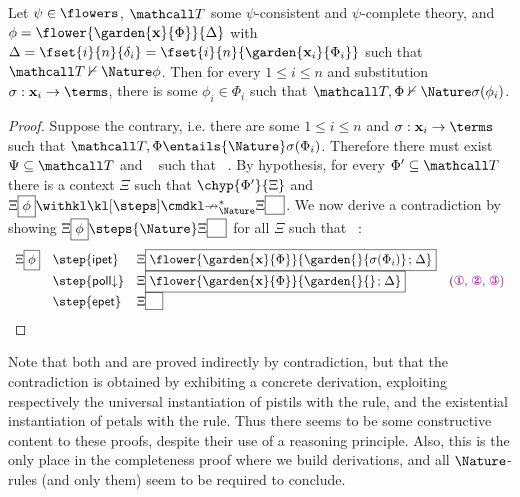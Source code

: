 \begin{proposition}
  
  Let $\psi \in \flowers$, $\tT$ some $\psi$-consistent and $\psi$-complete
  theory, and $\phi = \flower{\garden{\bx}{\Phi}}{\Delta}$ with $\Delta
  = \fset{i}{n}{\delta_i} = \fset{i}{n}{\garden{\bx_i}{\Phi_i}}$ such
  that $\tT \nvdash{\Nature} \phi$. Then for every $1 \leq i \leq n$ and substitution
  $\sigma : \bx_i \to \terms$, there is some $\phi_i \in \Phi_i$ such
  that $\tT, \Phi \nvdash{\Nature} \sigma(\phi_i)$.
\end{proposition}
\begin{proof}
  Suppose the contrary, i.e. there are some $1 \leq i \leq n$ and $\sigma :
  \bx_i \to \terms$ such that $\tT, \Phi \entails{\Nature} \sigma(\Phi_i)$.
  Therefore there must exist $\Psi \subseteq \tT$ and \Hyp{$\Phi_0 \subseteq
  \Phi$}~{\HOne} such that ~{\HTwo}. By hypothesis, for every $\Phi' \subseteq \tT$ there
  is a context $\Xi$ such that $\chyp{\Phi'}{\Xi}$ and $\cfill{\Xi}{\phi}
  \notsteps{\Nature} \cfill{\Xi}{\phantom{\Phi}}$. We now derive a contradiction
  by showing $\cfill{\Xi}{\phi} \steps{\Nature} \cfill{\Xi}{\phantom{\Phi}}$ for
  all $\Xi$ such that \Hyp{$\chyp{\Psi}{\Xi}$}~{\HThree}:
  $$
  \begin{array}{rlll}
    \cfill{\Xi}{\phi}
    &\step{\mathsf{ipet}} &\cfill{\Xi}{\flower{\garden{\bx}{\Phi}}{\garden{{}}{\sigma(\Phi_i)} \sep \Delta}} & \\
    &\step{\mathsf{poll}{\da}} &\cfill{\Xi}{\flower{\garden{\bx}{\Phi}}{\garden{{}}{{}} \sep \Delta}} &\text{(\HOne, \HTwo, \HThree)} \\
    &\step{\mathsf{epet}} &\cfill{\Xi}{\phantom{\Phi}} &
  \end{array}
  $$
\end{proof}

\begin{remark}
Note that both  and  are
proved indirectly by contradiction, but that the contradiction is obtained by
exhibiting a concrete derivation, exploiting respectively the universal
instantiation of pistils with the  rule, and the existential
instantiation of petals with the  rule. Thus there seems to be some
constructive content to these proofs, despite their use of a  reasoning
principle. Also, this is the only place in the completeness proof where we build
derivations, and all $\Nature$-rules (and only them) seem to be required to
conclude.
\end{remark}

